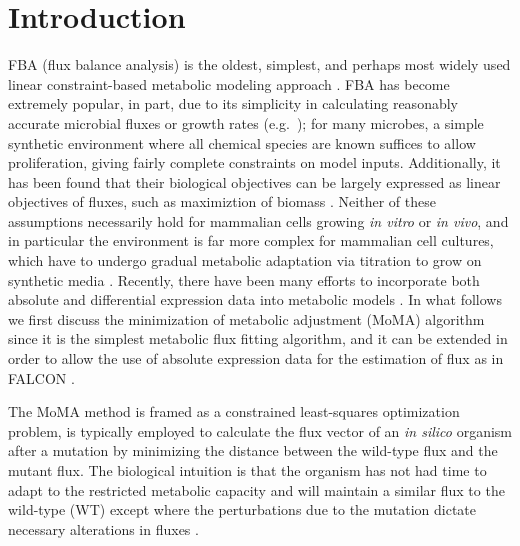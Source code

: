 \section{Introduction}

%
%
FBA (flux balance analysis) is the oldest, simplest, and perhaps
most widely used linear constraint-based metabolic modeling approach
\citep{Shestov2013a,Lewis2012}. FBA has become extremely popular, in
part, due to its simplicity in calculating reasonably accurate
microbial fluxes or growth rates
(e.g.\ \citealt{Schuetz2012,Fong2004_sb2013}); for
many microbes, a simple synthetic environment where all chemical
species are known suffices to allow proliferation, giving fairly
complete constraints on model inputs. Additionally, it has been found
that their biological objectives can be largely expressed as linear
objectives of fluxes, such as maximiztion of biomass \citep{Schuetz2012}. 
Neither of these assumptions necessarily hold for mammalian cells growing \textit{in
  vitro} or \textit{in vivo}, and in particular the environment is far
more complex for mammalian cell cultures, which have to undergo
gradual metabolic adaptation via titration to grow on synthetic media
\citep{Pirkmajer2011}. Recently, there have been many efforts to 
incorporate both absolute and differential expression data into metabolic 
models \citep{Blazier2012}. In what follows we first discuss the
minimization of metabolic adjustment (MoMA) algorithm since it is the
simplest metabolic flux fitting algorithm, and it can be extended in
order to allow the use of absolute expression data for the estimation
of flux as in FALCON \citep{Segre2002,Lee2012}.


The MoMA method is framed as a constrained least-squares optimization
problem, is typically employed to calculate the flux vector of an
\textit{in silico} organism after a mutation by minimizing the distance
between the wild-type flux and the mutant flux. The biological
intuition is that the organism has not had time to adapt to the
restricted metabolic capacity and will maintain a similar flux to the
wild-type (WT) except where the perturbations due to the mutation
dictate necessary alterations in fluxes \citep{Shlomi2005}.

